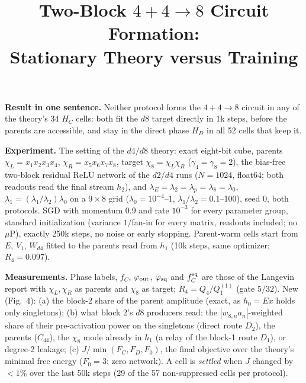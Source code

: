 \documentclass[10pt]{article}
\title{\vspace{-1.15cm}\textbf{Two-Block $4{+}4{\to}8$ Circuit Formation:\\Stationary Theory versus Training}}
\author{}
\date{\vspace{-1.3cm}}
\begin{document}
\maketitle
\vspace{-0.75cm}

\textbf{Result in one sentence.}
Neither protocol forms the $4{+}4{\to}8$ circuit in any of the theory's 34 $H_C$ cells: both fit
the $d8$ target directly in 1k steps, before the parents are accessible, and stay in the
direct phase $H_D$ in all 52 cells that keep it.

\textbf{Experiment.}
The setting of the $d4/d8$ theory: exact eight-bit cube, parents $\chi_L=x_1x_2x_3x_4$,
$\chi_R=x_5x_6x_7x_8$, target $\chi_8=\chi_L\chi_R$ ($\gamma_4=\gamma_8=2$), the bias-free
two-block residual ReLU network of the $d2/d4$ runs ($N=1024$, float64; both readouts read the
final stream $h_2$), and $\lambda_E=\lambda_2=\lambda_p=\lambda_8=\lambda_0$,
$\lambda_1=(\lambda_1/\lambda_2)\lambda_0$ on a $9\times8$ grid ($\lambda_0=10^{-4}$--1,
$\lambda_1/\lambda_2=0.1$--100), seed 0, both protocols.  SGD with momentum 0.9 and rate
$10^{-3}$ for every parameter group, standard initialization (variance $1/$fan-in for every
matrix, readouts included; no $\mu$P), exactly 250k steps, no noise or early stopping.
Parent-warm cells start from $E$, $V_1$, $W_{d4}$ fitted to the parents read from $h_1$ (10k
steps, same optimizer; $R_4=0.097$).

\textbf{Measurements.}  Phase labels, $f_C$, $\varphi_{\rm out}$, $\varphi_{\rm sq}$ and
$f_C^{\rm sq}$ are those of the Langevin report with $\chi_L,\chi_R$ as parents and $\chi_8$ as
target; $R_4=Q_4/Q_1^{(1)}$ (gate $5/32$).  New (Fig.~4): (a) the block-2 share of the parent
amplitude (exact, as $h_0=Ex$ holds only singletons); (b) what block 2's $d8$ producers read: the
$|w_{8,n}a_n|$-weighted share of their pre-activation power on the singletons (direct route
$D_2$), the parents ($C_{44}$), the $\chi_8$ mode already in $h_1$ (a relay of the block-1 route
$D_1$), or degree-2 leakage; (c) $J/\min(F_C,F_D,F_0)$, the final objective over the theory's
minimal free energy ($F_0=3$: zero network).  A cell is \emph{settled} when $J$ changed by
$<1\%$ over the last 50k steps (29 of the 57 non-suppressed cells per protocol).
\end{document}
